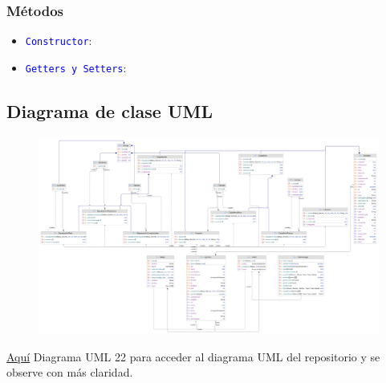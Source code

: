 \documentclass{article}
\begin{document}
\subsubsection{Métodos}
\begin{itemize}
    \item \texttt{\textcolor{blue}{Constructor}}: 
\end{itemize}

\begin{itemize}
    \item \texttt{\textcolor{blue}{Getters y Setters}}: 
\end{itemize}







\newpage

\subsection{Diagrama de clase UML}
\begin{figure}[H]
    \centering
    \includegraphics[width=1.1
    \textwidth,keepaspectratio]{img/22uml.png}
    \caption{}
\end{figure}

\href{https://github.com/hernanchoquehuanca/fp2-23b/blob/main/fase03/lab22/latex/img/22uml.png}{Aquí} Diagrama UML 22 para acceder al diagrama UML del repositorio y se observe con más claridad.

\end{document}
